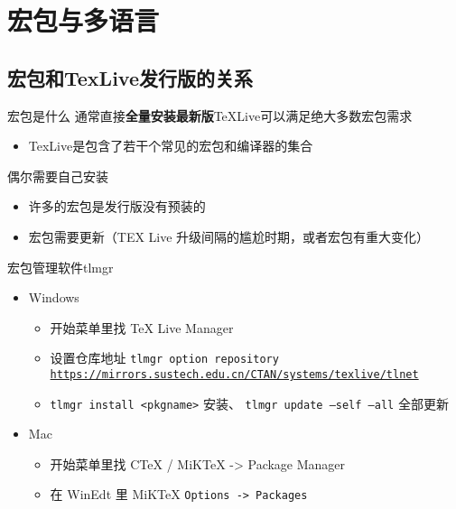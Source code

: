 \section{宏包与多语言}
\subsection{宏包和TexLive发行版的关系}
\begin{frame}{宏包是什么}
	通常直接\textbf{全量安装最新版}TeXLive可以满足绝大多数宏包需求
	\begin{itemize}
		\item TexLive是包含了若干个常见的宏包和编译器的集合
	\end{itemize}
	偶尔需要自己安装
	\begin{itemize}
		\item 许多的宏包是发行版没有预装的
		\item 宏包需要更新（TEX Live 升级间隔的尴尬时期，或者宏包有重大变化）
	\end{itemize}
	宏包管理软件tlmgr
	\begin{itemize}
		\item<+-> Windows
		      \begin{itemize}
			      \item 开始菜单里找 TeX Live Manager
			      \item 设置仓库地址 \texttt{tlmgr option repository \url{https://mirrors.sustech.edu.cn/CTAN/systems/texlive/tlnet}}
			      \item \texttt{tlmgr install <pkgname>} 安装、 \texttt{tlmgr update --self --all} 全部更新
		      \end{itemize}
		\item<+-> Mac
		      \begin{itemize}
			      \item 开始菜单里找 CTeX / MiKTeX -> Package Manager
			      \item 在 WinEdt 里 MiKTeX \texttt{Options -> Packages}
		      \end{itemize}
	\end{itemize}
	\vspace{0.4cm} %
\end{frame}

